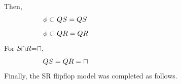 \documentclass[10pt,journal]{IEEEtran}
\begin{document}
Then, 
\begin{equation}
 \begin{minipage}{250pt}
\begin{flushleft} $\displaystyle \phi \subset QS=QS$  \end{flushleft}
 \end{minipage}
 \end{equation}
\begin{equation}
 \begin{minipage}{250pt}
\begin{flushleft} $\displaystyle \phi \subset QR=QR$  \end{flushleft}
 \end{minipage}
 \end{equation}
For $S$$\cap$$R$=$\sqcap$, 
\begin{equation}
 \begin{minipage}{250pt}
\begin{flushleft} $\displaystyle QS = QR = \sqcap$  \end{flushleft}
 \end{minipage}
 \end{equation}
Finally, the SR flipflop model was completed as follows.
\end{document}
